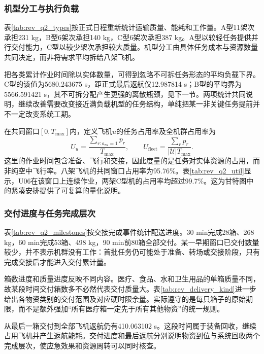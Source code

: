 \subsubsection{机型分工与执行负载}
表\ref{tab:rev_q2_types}按正式日程重新统计运输质量、能耗和工作量。A型11架次承担231 kg，B型6架次承担140 kg，C型6架次承担387 kg。A型以较轻任务提供并行交付能力，C型以较少架次承担较大质量。机型分工由具体任务成本与资源数量共同决定，而非将需求平均拆给八架飞机。


把各类累计作业时间除以实体数量，可得到忽略不可拆任务形态的平均负载下界。C型的该值为5680.243675 s，距正式最后返航仅12.987814 s；B型的平均界为5566.591421 s，其不可拆分配产生更强的离散瓶颈，见下一节。两项统计共同说明，继续改善需要改变接近满负载机型的任务结构，单纯把某一非关键任务提前并不一定改变系统工期。

在共同窗口$[0,T_{\max}]$内，定义飞机$u$的任务占用率及全机群占用率为
\begin{equation}
 U_u=\frac{\sum_{r:a_{ru}=1}p_r}{T_{\max}},\qquad
 U_{\mathrm{fleet}}=\frac{\sum_rp_r}{|\mathcal U|T_{\max}}.
 \label{eq:q2_occupation}
\end{equation}
这里的作业时间包含准备、飞行和交接，因此度量的是任务对实体资源的占用，而非纯空中飞行率。八架飞机的共同窗口占用率为95.76\%。表\ref{tab:rev_q2_util}显示，U06在该窗口上连续作业，两架C型机的占用率均超过99.7\%。这为甘特图中的紧凑安排提供了可复算的量化说明。


\subsubsection{交付进度与任务完成层次}
表\ref{tab:rev_q2_milestones}按交接完成事件统计配送进度。30 min完成28箱、268 kg，60 min完成53箱、498 kg，90 min前80箱全部交付。某一早期窗口已交付数量较少，并不表示机群没有工作：首批任务仍可能处于准备、转场或交接阶段，只有完成交接后才能进入交付累计量。


箱数进度和质量进度反映不同内容。医疗、食品、水和卫生用品的单箱质量不同，故某段时间交付箱数多不必然代表交付质量大。表\ref{tab:rev_delivery_kind}进一步给出各物资类别的交付范围及对应硬时限余量。实际遵守的是每只箱子的原始期限，而不是额外强加“所有医疗箱一定先于所有其他物资”的统一规则。


从最后一箱交付到全部飞机返航仍有410.063102 s。这段时间属于装备回收，继续占用飞机并产生返航能耗。交付进度和最后返航分别说明物资到位与系统回收两个完成层次，使应急效果和资源周转可以同时核查。

